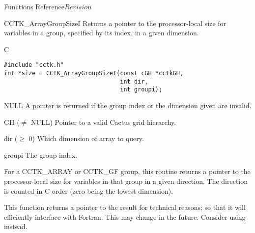 \begin{cactuspart}{ Functions Reference}{}{$Revision$}
\begin{FunctionDescription}{CCTK\_ArrayGroupSizeI}{}
\label{CCTK-ArrayGroupSizeI}
Returns a pointer to the processor-local size for variables in a
group, specified by its index, in a given dimension.
\begin{SynopsisSection}
\begin{Synopsis}{C}
\begin{verbatim}
#include "cctk.h"
int *size = CCTK_ArrayGroupSizeI(const cGH *cctkGH,
                                 int dir,
                                 int groupi);
\end{verbatim}
\end{Synopsis}
\end{SynopsisSection}

\begin{ResultSection}
\begin{Result}{NULL}
A  pointer is returned if the group index or the dimension
given are invalid.
\end{Result}
\end{ResultSection}

\begin{ParameterSection}
\begin{Parameter}{GH ($\ne$ NULL)}
Pointer to a valid Cactus grid hierarchy.
\end{Parameter}
\begin{Parameter}{dir ($\ge$ 0)}
Which dimension of array to query.
\end{Parameter}
\begin{Parameter}{groupi}
The group index.
\end{Parameter}
\end{ParameterSection}

\begin{Discussion}
For a CCTK\_ARRAY or CCTK\_GF group, this routine returns a pointer to
the processor-local size for variables in that group in a given
direction. The direction is counted in C order (zero being the lowest
dimension).

This function returns a pointer to the result for technical reasons;
so that it will efficiently interface with Fortran.  This may change
in the future.  Consider using  instead.
\end{Discussion}


\end{FunctionDescription}
\end{cactuspart}
